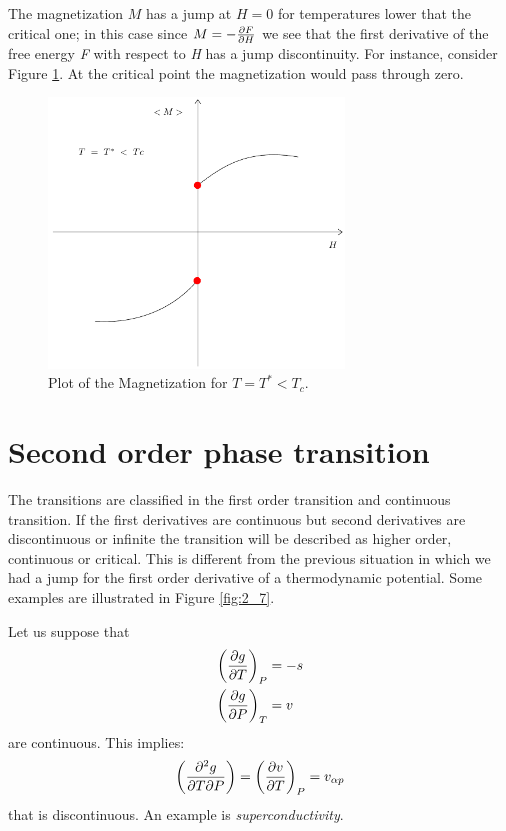 \documentclass[../main/main.tex]{subfiles}
\begin{document}
The magnetization \( M \) has a jump at \( H=0 \) for temperatures lower that the critical one; in this case since \( M = - \pdv{F}{H}  \) we see that the first derivative of the free energy \emph{F} with respect to \emph{H} has a jump discontinuity.
For instance, consider Figure \ref{fig:2_11}. At  the critical point the magnetization would pass through zero.


\begin{figure}[h!]
\centering
\includegraphics[width=0.7\textwidth]{../lessons/2_image/12.pdf}
\caption{\label{fig:2_11} Plot of the Magnetization for \( T = T^* < T_c \).}
\end{figure}






\clearpage

\section{Second order phase transition}
The transitions are classified in the first order transition and continuous transition.
If the first derivatives are continuous but second derivatives are discontinuous or infinite the transition will be described as higher order, continuous or critical. This is different from the previous situation in which we had a jump for the first order derivative of a thermodynamic potential. Some examples are illustrated in Figure \ref{fig:2_7}.

Let us suppose that
\begin{subequations}
\begin{align}
  \qty(\pdv{g}{T} )_P &= -s \\
  \qty(\pdv{g}{P} )_T &= v
\end{align}
\end{subequations}
are continuous. This implies:
\begin{equation}
  \qty(\pdv{g}{T}{P}  ) = \qty(\pdv{v}{T} )_P = v_{\alpha p}
  \label{eq:}
\end{equation}
that is discontinuous.
An example is \emph{superconductivity}.
\end{document}
